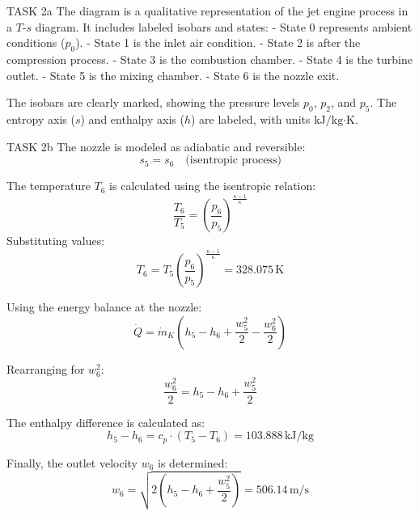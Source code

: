 TASK 2a  
The diagram is a qualitative representation of the jet engine process in a \( T \)-\( s \) diagram. It includes labeled isobars and states:  
- State 0 represents ambient conditions (\( p_0 \)).  
- State 1 is the inlet air condition.  
- State 2 is after the compression process.  
- State 3 is the combustion chamber.  
- State 4 is the turbine outlet.  
- State 5 is the mixing chamber.  
- State 6 is the nozzle exit.  

The isobars are clearly marked, showing the pressure levels \( p_0 \), \( p_2 \), and \( p_5 \). The entropy axis (\( s \)) and enthalpy axis (\( h \)) are labeled, with units \( \text{kJ/kg·K} \).  

TASK 2b  
The nozzle is modeled as adiabatic and reversible:  
\[
s_5 = s_6 \quad \text{(isentropic process)}  
\]  

The temperature \( T_6 \) is calculated using the isentropic relation:  
\[
\frac{T_6}{T_5} = \left( \frac{p_6}{p_5} \right)^{\frac{\kappa - 1}{\kappa}}  
\]  
Substituting values:  
\[
T_6 = T_5 \left( \frac{p_6}{p_5} \right)^{\frac{\kappa - 1}{\kappa}} = 328.075 \, \text{K}  
\]  

Using the energy balance at the nozzle:  
\[
\dot{Q} = \dot{m}_K \left( h_5 - h_6 + \frac{w_5^2}{2} - \frac{w_6^2}{2} \right)  
\]  

Rearranging for \( w_6^2 \):  
\[
\frac{w_6^2}{2} = h_5 - h_6 + \frac{w_5^2}{2}  
\]  

The enthalpy difference is calculated as:  
\[
h_5 - h_6 = c_p \cdot (T_5 - T_6) = 103.888 \, \text{kJ/kg}  
\]  

Finally, the outlet velocity \( w_6 \) is determined:  
\[
w_6 = \sqrt{2 \left( h_5 - h_6 + \frac{w_5^2}{2} \right)} = 506.14 \, \text{m/s}  
\]